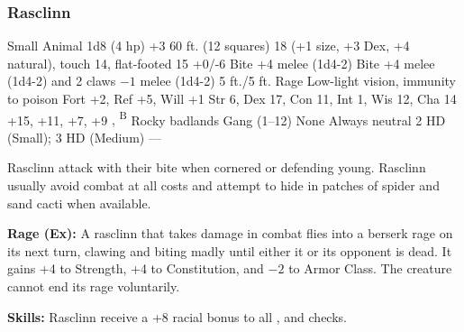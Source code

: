 \subsubsection{Rasclinn}
\begin{MonsterStats}
{Small Animal}
{1d8 (4 hp)}
{+3}
{60 ft. (12 squares)}
{18 (+1 size, +3 Dex, +4 natural), touch 14, flat-footed 15}
{+0/-6}
{Bite +4 melee (1d4-2)}
{Bite +4 melee (1d4-2) and 2 claws $-1$ melee (1d4-2)}
{5 ft./5 ft.}
{Rage}
{Low-light vision, immunity to poison}
{Fort +2, Ref +5, Will +1}
{Str 6, Dex 17, Con 11, Int 1, Wis 12, Cha 14}
{ +15,  +11,  +7,  +9}
{, \textsuperscript{B}}
{Rocky badlands}
{Gang (1--12)}
{\onehalf}
{None}
{Always neutral}
{2 HD (Small); 3 HD (Medium)}
{---}
\end{MonsterStats}


Rasclinn attack with their bite when cornered or defending young. Rasclinn usually avoid combat at all costs and attempt to hide in patches of spider and sand cacti when available.

\textbf{Rage (Ex):} A rasclinn that takes damage in combat flies into a berserk rage on its next turn, clawing and biting madly until either it or its opponent is dead. It gains +4 to Strength, +4 to Constitution, and $-2$ to Armor Class. The creature cannot end its rage voluntarily.

\textbf{Skills:} Rasclinn receive a +8 racial bonus to all ,  and  checks.
